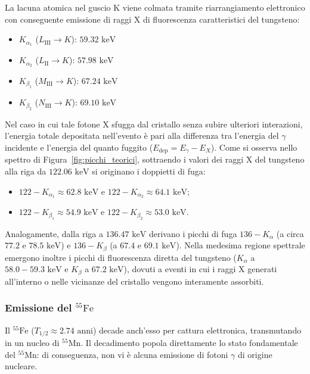 La lacuna atomica nel guscio K viene colmata tramite riarrangiamento elettronico con conseguente emissione di raggi X di fluorescenza caratteristici del tungsteno:
\begin{itemize}
    \item $K_{\alpha_1}$ ($L_{\text{III}} \to K$): $59.32\text{ keV}$
    \item $K_{\alpha_2}$ ($L_{\text{II}} \to K$): $57.98\text{ keV}$
    \item $K_{\beta_1}$ ($M_{\text{III}} \to K$): $67.24\text{ keV}$
    \item $K_{\beta_2}$ ($N_{\text{III}} \to K$): $69.10\text{ keV}$
\end{itemize}
Nel caso in cui tale fotone X sfugga dal cristallo senza subire ulteriori interazioni, l'energia totale depositata nell'evento è pari alla differenza tra l'energia del $\gamma$ incidente e l'energia del quanto fuggito ($E_{\text{dep}} = E_\gamma - E_X$). Come si osserva nello spettro di Figura~\ref{fig:picchi_teorici}, sottraendo i valori dei raggi X del tungsteno alla riga da $122.06\text{ keV}$ si originano i doppietti di fuga:
\begin{itemize}
    \item $122 - K_{\alpha_1} \approx 62.8\text{ keV}$ e $122 - K_{\alpha_2} \approx 64.1\text{ keV}$;
    \item $122 - K_{\beta_1} \approx 54.9\text{ keV}$ e $122 - K_{\beta_2} \approx 53.0\text{ keV}$.
\end{itemize}
Analogamente, dalla riga a $136.47\text{ keV}$ derivano i picchi di fuga $136 - K_\alpha$ (a circa $77.2$ e $78.5\text{ keV}$) e $136 - K_\beta$ (a $67.4$ e $69.1\text{ keV}$). Nella medesima regione spettrale emergono inoltre i picchi di fluorescenza diretta del tungsteno ($K_\alpha$ a $58.0-59.3\text{ keV}$ e $K_\beta$ a $67.2\text{ keV}$), dovuti a eventi in cui i raggi X generati all'interno o nelle vicinanze del cristallo vengono interamente assorbiti.

\subsubsection*{Emissione del $^{55}\text{Fe}$}
Il $^{55}\text{Fe}$ ($T_{1/2} \approx 2.74\text{ anni}$) decade anch'esso per cattura elettronica, transmutando in un nucleo di $^{55}\text{Mn}$. Il decadimento popola direttamente lo stato fondamentale del $^{55}\text{Mn}$: di conseguenza, non vi è alcuna emissione di fotoni $\gamma$ di origine nucleare.

